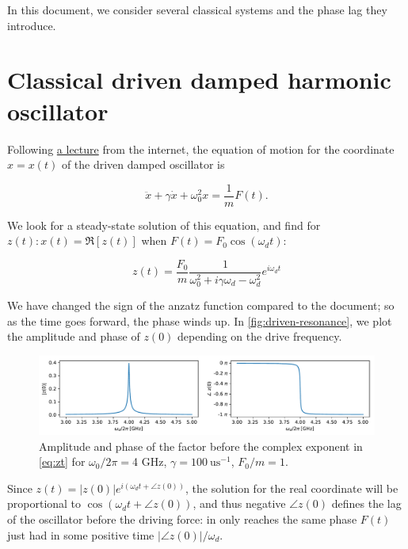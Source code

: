 \documentclass{article}
\begin{document}
	
	In this document, we consider several classical systems and the phase lag they introduce.
	
	\section{Classical driven damped harmonic oscillator}
	
	Following \href{https://scholar.harvard.edu/files/schwartz/files/lecture2-driven-oscillators.pdf}{a lecture} from the internet, the equation of motion for the coordinate $ x = x (t) $ of the driven damped oscillator is
	
	\begin{equation}
	\ddot{x} + \gamma \dot{x} + \omega_0^2 x = \frac{1}{m} F(t). 
	\end{equation}
	
	We look for a steady-state solution of this equation, and find for $ z(t): x(t) = \Re[z(t)] $ when $F(t) = F_0\cos(\omega_d t)$:
	
	\begin{equation}
	z(t) = \frac{F_0}{m}\frac{1}{\omega_0^2 + i \gamma \omega_d - \omega_d^2} e^{i\omega_d t}
	\label{eq:zt}
	\end{equation}
	
	We have changed the sign of the anzatz function compared to the document; so as the time goes forward, the phase winds up. In \autoref{fig:driven-resonance}, we plot the amplitude and phase of $z(0)$ depending on the drive frequency.
	
	\begin{figure}[h!]
		\centering
		\includegraphics[width=\linewidth]{"Pictures/Plotting/driven resonance"}
		\caption{Amplitude and phase of the factor before the complex exponent in \autoref{eq:zt}  for $\omega_0/2\pi = $4 GHz, $\gamma = 100\  \text{us}^{-1}$, $ F_0/m = 1 $.}
		\label{fig:driven-resonance}
	\end{figure}

	Since $z(t) = |z(0)| e^{i(\omega_dt + \angle z(0) )}$, the solution for the real coordinate will be proportional to $\cos(\omega_d t + \angle z(0))$, and thus negative $\angle z(0)$ defines the lag of the oscillator before the driving force: in only reaches the same phase $F(t)$ just had in some positive time $|\angle z(0)|/\omega_d$.
	
\end{document}
